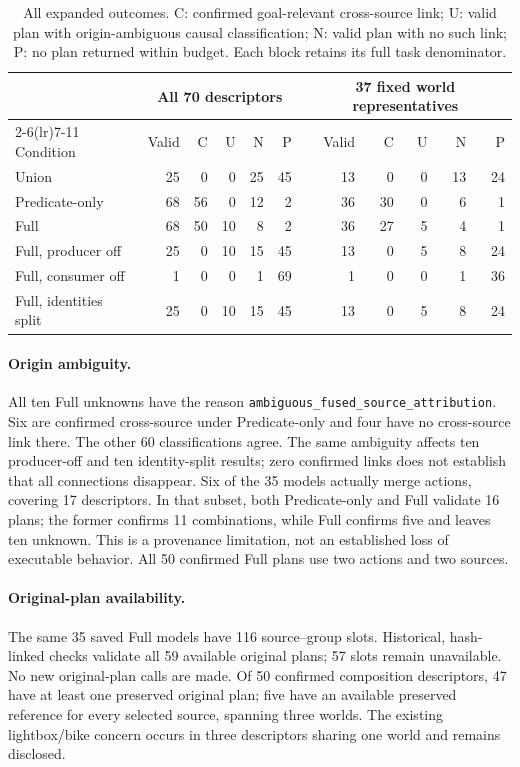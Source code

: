 \begin{table}[t]
\centering
\caption{All expanded outcomes. C: confirmed goal-relevant cross-source link; U: valid plan with origin-ambiguous causal classification; N: valid plan with no such link; P: no plan returned within budget. Each block retains its full task denominator.}
\label{tab:expanded-deduplicated}
\begin{tabular}{lrrrrrrrrrr}
\toprule
& \multicolumn{5}{c}{All 70 descriptors} & \multicolumn{5}{c}{37 fixed world representatives}\\
\cmidrule(lr){2-6}\cmidrule(lr){7-11}
Condition & Valid & C & U & N & P & Valid & C & U & N & P\\
\midrule
Union & 25 & 0 & 0 & 25 & 45 & 13 & 0 & 0 & 13 & 24\\
Predicate-only & 68 & 56 & 0 & 12 & 2 & 36 & 30 & 0 & 6 & 1\\
Full & 68 & 50 & 10 & 8 & 2 & 36 & 27 & 5 & 4 & 1\\
Full, producer off & 25 & 0 & 10 & 15 & 45 & 13 & 0 & 5 & 8 & 24\\
Full, consumer off & 1 & 0 & 0 & 1 & 69 & 1 & 0 & 0 & 1 & 36\\
Full, identities split & 25 & 0 & 10 & 15 & 45 & 13 & 0 & 5 & 8 & 24\\
\bottomrule
\end{tabular}
\end{table}

\paragraph{Origin ambiguity.}
All ten Full unknowns have the reason \texttt{ambiguous\_fused\_source\_attribution}. Six are confirmed cross-source under Predicate-only and four have no cross-source link there. The other 60 classifications agree. The same ambiguity affects ten producer-off and ten identity-split results; zero confirmed links does not establish that all connections disappear. Six of the 35 models actually merge actions, covering 17 descriptors. In that subset, both Predicate-only and Full validate 16 plans; the former confirms 11 combinations, while Full confirms five and leaves ten unknown. This is a provenance limitation, not an established loss of executable behavior. All 50 confirmed Full plans use two actions and two sources.

\paragraph{Original-plan availability.}
The same 35 saved Full models have 116 source--group slots. Historical, hash-linked checks validate all 59 available original plans; 57 slots remain unavailable. No new original-plan calls are made. Of 50 confirmed composition descriptors, 47 have at least one preserved original plan; five have an available preserved reference for every selected source, spanning three worlds. The existing lightbox/bike concern occurs in three descriptors sharing one world and remains disclosed.

